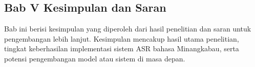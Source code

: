 \subsection*{Bab V Kesimpulan dan Saran}
Bab ini berisi kesimpulan yang diperoleh dari hasil penelitian dan saran untuk pengembangan lebih lanjut. Kesimpulan mencakup hasil utama penelitian, tingkat keberhasilan implementasi sistem ASR bahasa Minangkabau, serta potensi pengembangan model atau sistem di masa depan.

\clearpage
\null
\thispagestyle{empty}
\newpage